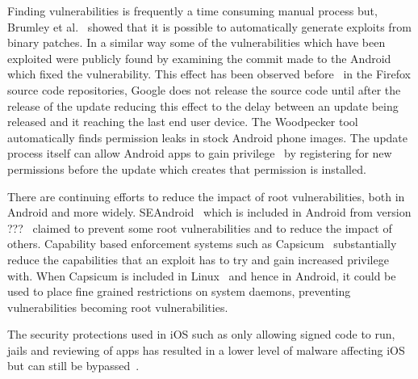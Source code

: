 \documentclass[conference,a4paper,twoside]{IEEEtran}
\begin{document}
Finding vulnerabilities is frequently a time consuming manual process but, Brumley et al.~\cite{Brumley2008} showed that it is possible to automatically generate exploits from binary patches.
In a similar way some of the vulnerabilities which have been exploited were publicly found by examining the commit made to the Android which fixed the vulnerability.
This effect has been observed before~\cite{Barth2011} in the Firefox source code repositories, Google does not release the source code until after the release of the update reducing this effect to the delay between an update being released and it reaching the last end user device.
The Woodpecker tool~\cite{Grace2012} automatically finds permission leaks in stock Android phone images.
The update process itself can allow Android apps to gain privilege~\cite{Xing2014} by registering for new permissions before the update which creates that permission is installed.


There are continuing efforts to reduce the impact of root vulnerabilities, both in Android and more widely.
SEAndroid~\cite{Smalley2013} which is included in Android from version ???~\cite{TODO} claimed to prevent some root vulnerabilities and to reduce the impact of others.
Capability based enforcement systems such as Capsicum~\cite{Watson2010} substantially reduce the capabilities that an exploit has to try and gain increased privilege with.
When Capsicum is included in Linux~\cite{TODO} and hence in Android, it could be used to place fine grained restrictions on system daemons, preventing vulnerabilities becoming root vulnerabilities.

The security protections used in iOS such as only allowing signed code to run, jails and reviewing of apps has resulted in a lower level of malware affecting iOS~\cite{TODO} but can still be bypassed~\cite{Wang2013a}. %
\end{document}
